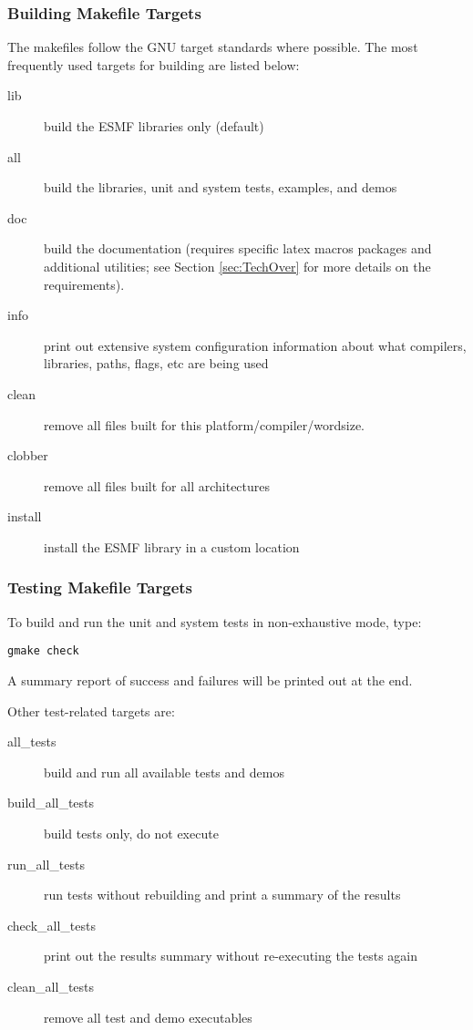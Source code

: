 \subsubsection{Building Makefile Targets}

The makefiles follow the GNU target standards where possible.
The most frequently used targets for building are listed below:
\begin{description}
\item[lib] build the ESMF libraries only (default)
\item[all] build the libraries, unit and system tests, examples, and demos
\item[doc] build the documentation (requires specific latex macros packages
and additional utilities; see Section \ref{sec:TechOver} for more details
on the requirements).  
\item[info] print out extensive system configuration information about what
           compilers, libraries, paths, flags, etc are being used
\item[clean] remove all files built for this platform/compiler/wordsize.
\item[clobber] remove all files built for all architectures
\item[install] install the ESMF library in a custom location
\end{description}


\subsubsection{Testing Makefile Targets}

To build and run the unit and system tests in non-exhaustive mode, type:
\begin{verbatim}
gmake check
\end{verbatim}
A summary report of success and failures will be printed out at the end.

\noindent Other test-related targets are:
\begin{description}
\item[all\_tests] build and run all available tests and demos
\item[build\_all\_tests] build tests only, do not execute
\item[run\_all\_tests] run tests without rebuilding and print a
summary of the results
\item[check\_all\_tests] 
print out the results summary without re-executing the tests again
\item[clean\_all\_tests] remove all test and demo executables 
\end{description}

